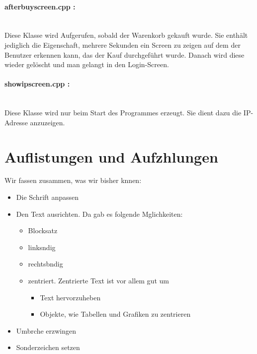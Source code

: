 \documentclass[11pt,a4paper]{article} %
\begin{document}
\paragraph{afterbuyscreen.cpp :} $\;$ \\
	Diese Klasse wird Aufgerufen, sobald der Warenkorb gekauft wurde. Sie enthält jediglich die Eigenschaft, mehrere Sekunden ein Screen zu zeigen auf dem der Benutzer erkennen kann, das der Kauf durchgeführt wurde.
	Danach wird diese wieder gelöscht und man gelangt in den Login-Screen.

\paragraph{showipscreen.cpp :} $\;$ \\
		Diese Klasse wird nur beim Start des Programmes erzeugt. Sie dient dazu die IP-Adresse anzuzeigen.



\section{Auflistungen und Aufzhlungen}
\label{Listen}

Wir fassen zusammen, was wir bisher knnen:

\begin{itemize}
 \item Die Schrift anpassen
 \item Den Text ausrichten. Da gab es folgende Mglichkeiten:
    \begin{itemize}
        \item Blocksatz
        \item linksndig
        \item rechtsbndig
        \item zentriert. Zentrierte Text ist vor allem gut um
            \begin{itemize}
                \item Text hervorzuheben
                \item Objekte, wie Tabellen und Grafiken zu zentrieren
            \end{itemize}
    \end{itemize}
 \item Umbrche erzwingen
 \item Sonderzeichen setzen
\end{itemize}
\end{document}
